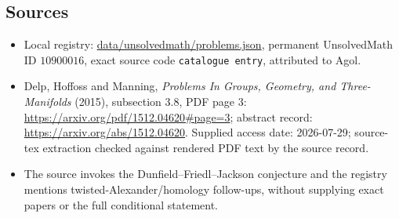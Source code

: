 \documentclass[11pt]{article}
\begin{document}
\subsection{Sources}
\begin{itemize}
\item Local registry: \url{data/unsolvedmath/problems.json}, permanent UnsolvedMath ID $10900016$, exact source code \texttt{catalogue entry}, attributed to Agol.
\item Delp, Hoffoss and Manning, \emph{Problems In Groups, Geometry, and Three-Manifolds} (2015), subsection 3.8, PDF page 3: \url{https://arxiv.org/pdf/1512.04620#page=3}; abstract record: \url{https://arxiv.org/abs/1512.04620}. Supplied access date: 2026-07-29; source-tex extraction checked against rendered PDF text by the source record.
\item The source invokes the Dunfield--Friedl--Jackson conjecture and the registry mentions twisted-Alexander/homology follow-ups, without supplying exact papers or the full conditional statement.
\end{itemize}
\end{document}
